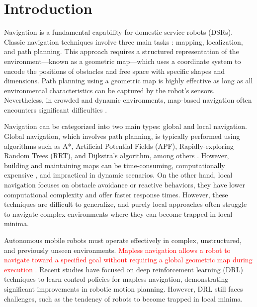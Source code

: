 \documentclass[robotics,article,submit,pdftex,moreauthors]{Definitions/mdpi}
\begin{document}
\section{Introduction}

Navigation is a fundamental capability for domestic service robots (DSRs). Classic navigation techniques involve three main tasks \citep{placed2023surveyactivesimultaneouslocalization, 10.11648/j.frontiers.20240403.13, Valencia2018, gao2017path, 7784311}: mapping, localization, and path planning. This approach requires a structured representation of the environment—known as a geometric map—which uses a coordinate system to encode the positions of obstacles and free space with specific shapes and dimensions. Path planning using a geometric map is highly effective as long as all environmental characteristics can be captured by the robot's sensors. Nevertheless, in crowded and dynamic environments, map-based navigation often encounters significant difficulties \citep{duberg2024dufomapefficientdynamicawareness, 10.1109/TRO.2016.2624754}. 

Navigation can be categorized into two main types: global and local navigation. Global navigation, which involves path planning, is typically performed using algorithms such as A*, Artificial Potential Fields (APF), Rapidly-exploring Random Trees (RRT), and Dijkstra's algorithm, among others \citep{Navigation_2D_LIDAR, Acomp_study_robot_nav}.  However, building and maintaining maps can be time-consuming, computationally expensive \citep{ir.2024.17, 10.1109/TRO.2016.2624754}, and impractical in dynamic scenarios. On the other hand, local navigation focuses on obstacle avoidance or reactive behaviors, they have lower computational complexity and offer faster response times. However, these techniques are difficult to generalize, and purely local approaches often struggle to navigate complex environments where they can become trapped in local minima.

Autonomous mobile robots must operate effectively in complex, unstructured, and previously unseen environments. \textcolor{red}{Mapless navigation allows a robot to navigate toward a specified goal without requiring a global geometric map during execution \citep{pmlr-v229-liang23a}.} Recent studies have focused on deep reinforcement learning (DRL) techniques to learn control policies for mapless navigation, demonstrating significant improvements in robotic motion planning. However, DRL still faces challenges, such as the tendency of robots to become trapped in local minima.
\end{document}
